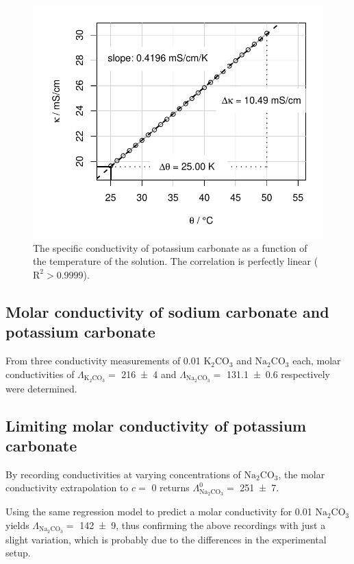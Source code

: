 \begin{figure}[H]
    \centering
    \includegraphics[width=.45\textwidth]{figures/plots/lfk_temperature.pdf}
    \caption{The specific conductivity of potassium carbonate as a function of the temperature of the solution. The correlation is perfectly linear ($\mathrm{R}^2 > 0.9999$).}
    \label{fig:lfk_temp}
\end{figure}



\subsection{Molar conductivity of sodium carbonate and potassium carbonate}

From three conductivity measurements of \qty{0.01}{\M} $\mathrm{K_2CO_3}$ and $\mathrm{Na_2CO_3}$ each, molar conductivities of $\Lambda_{\mathrm{K_2CO_3}} = $ \qty{216 \pm 4}{\Smolar} and $\Lambda_{\mathrm{Na_2CO_3}} = $ \qty{131.1 \pm 0.6}{\Smolar} respectively were determined.


\subsection{Limiting molar conductivity of potassium carbonate}

By recording conductivities at varying concentrations of $\mathrm{Na_2CO_3}$, the molar conductivity extrapolation to $c = $ \qty{0}{\M} returns $\Lambda^0_{\mathrm{Na_2CO_3}} = $ \qty{251 \pm 7}{\Smolar}.

Using the same regression model to predict a molar conductivity for \qty{0.01}{\M} $\mathrm{Na_2CO_3}$ yields $\Lambda_{\mathrm{Na_2CO_3}} = $ \qty{142 \pm 9}{\Smolar}, thus confirming the above recordings with just a slight variation, which is probably due to the differences in the experimental setup.

